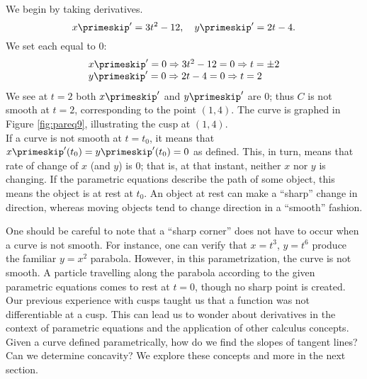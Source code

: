 {We begin by taking derivatives. 
\[
x\primeskip' = 3t^2-12,\quad y\primeskip' = 2t-4.
\]
We set each equal to 0:
\[
\begin{array}{l}x\primeskip' = 0 \Rightarrow 3t^2-12=0 \Rightarrow t=\pm 2\\
  y\primeskip'=0 \Rightarrow 2t-4 = 0 \Rightarrow t=2
	\end{array}
\]
We see at $t=2$ both $x\primeskip'$ and $y\primeskip'$ are 0; thus $C$ is not smooth at $t=2$, corresponding to the point $(1,4)$. The curve is graphed in Figure \ref{fig:pareq9}, illustrating the cusp at $(1,4)$.
}\\

If a curve is not smooth at $t=t_0$, it means that $x\primeskip'(t_0)=y\primeskip'(t_0)=0$ as defined. This, in turn, means that rate of change of $x$ (and $y$) is 0; that is, at that instant, neither $x$ nor $y$ is changing. If the parametric equations describe the path of some object, this means the object is at rest at $t_0$. An object at rest can make a ``sharp'' change in direction, whereas moving objects tend to change direction in a ``smooth'' fashion.

One should be careful to note that a ``sharp corner'' does not have to occur when a curve is not smooth. For instance, one can verify that $x=t^3$, $y=t^6$ produce the familiar $y=x^2$ parabola. However, in this parametrization, the curve is not smooth. A particle travelling along the parabola according to the given parametric equations comes to rest at $t=0$, though no sharp point is created.\\

Our previous experience with cusps taught us that a function was not differentiable at a cusp. This can lead us to wonder about derivatives in the context of parametric equations and the application of other calculus concepts. Given a curve defined parametrically, how do we find the slopes of tangent lines? Can we determine concavity? We explore these concepts and more in the next section.



